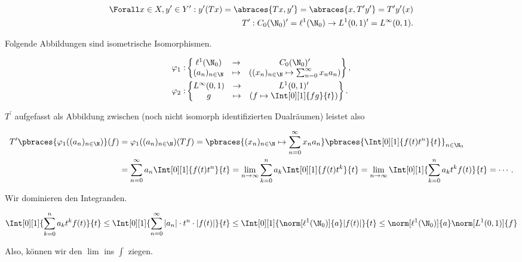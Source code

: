 \begin{solution}
\begin{align*}
  \Forall x \in X, y^\prime \in Y^\prime:
  y^\prime(T x)
  =
  \abraces{T x, y^\prime}
  =
  \abraces{x, T^\prime y^\prime}
  =
  T^\prime y^\prime(x) \\
  \quad
  T^\prime:
  C_0(\N_0)^\prime = \ell^1(\N_0)
  \to
  L^1(0, 1)^\prime = L^\infty(0, 1).
\end{align*}

Folgende Abbildungen sind isometrische Isomorphismen.

\begin{align*}
  \varphi_1:
  &
  \begin{Bmatrix}
    \ell^1(\N_0)        & \to     & C_0(\N_0)^\prime \\
    (a_n)_{n \in \N} & \mapsto &
    ((x_n)_{n \in \N} \mapsto \sum_{n=0}^\infty x_n a_n)
  \end{Bmatrix}, \\
  \varphi_2:
  &
  \begin{Bmatrix}
    L^\infty(0, 1) & \to    & L^1(0, 1)^\prime \\
    g              &\mapsto & (f \mapsto \Int[0][1]{fg}{t})
  \end{Bmatrix}.
\end{align*}

$T^\prime$ aufgefasst als Abbildung zwischen (noch nicht isomorph identifizierten Dualräumen) leistet also

\begin{align*}
  T^\prime \pbraces
  {
    \varphi_1((a_n)_{n \in \N})
  }(f)
  & =
  \varphi_1((a_n)_{n \in \N})(T f)
  =
  \pbraces{(x_n)_{n \in \N} \mapsto \sum_{n=0}^\infty x_n a_n}
  \pbraces{\Int[0][1]{f(t) t^n}{t}}_{n \in \N_0} \\
  & =
  \sum_{n=0}^\infty a_n
  \Int[0][1]{f(t) t^n}{t}
  =
  \lim_{n \to \infty} \sum_{k= 0}^n a_k
  \Int[0][1]{f(t) t^k}{t}
  =
  \lim_{n \to \infty}
  \Int[0][1]{\sum_{k=0}^n a_k t^k f(t)}{t} = \cdots.
\end{align*}

Wir dominieren den Integranden.

\begin{align*}
  \Int[0][1]{\sum_{k=0}^n a_k t^k f(t)}{t}
  \leq
  \Int[0][1]{\sum_{n=0}^\infty |a_n| \cdot t^n \cdot |f(t)|}{t}
  \leq
  \Int[0][1]{\norm[\ell^1(\N_0)]{a} |f(t)|}{t}
  \leq
  \norm[\ell^1(\N_0)]{a} \norm[L^1(0, 1)]{f}
\end{align*}

Also, können wir den $\lim$ ins $\int$ ziegen.


\end{solution}
